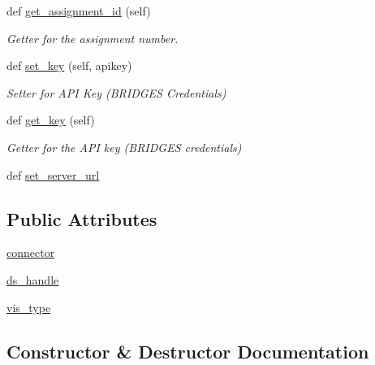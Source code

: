 \begin{DoxyCompactItemize}
def \hyperlink{classbridges_1_1bridges_1_1_bridges_a94f39f11368031ad33800aac0bac2f7d}{get\+\_\+assignment\+\_\+id} (self)
\begin{DoxyCompactList}\small\item\em Getter for the assignment number. \end{DoxyCompactList}\item 
def \hyperlink{classbridges_1_1bridges_1_1_bridges_a5841bc54e3663249e76f4b34f5a3a593}{set\+\_\+key} (self, apikey)
\begin{DoxyCompactList}\small\item\em Setter for A\+PI Key (B\+R\+I\+D\+G\+ES Credentials) \end{DoxyCompactList}\item 
def \hyperlink{classbridges_1_1bridges_1_1_bridges_afcdb0291c535b41fb7be31eaf5bf3677}{get\+\_\+key} (self)
\begin{DoxyCompactList}\small\item\em Getter for the A\+PI key (B\+R\+I\+D\+G\+ES credentials) \end{DoxyCompactList}\item 
def \hyperlink{classbridges_1_1bridges_1_1_bridges_a74009f2eaf24464f9769ea6166d20e59}{set\+\_\+server\+\_\+url}
\end{DoxyCompactItemize}
\subsection*{Public Attributes}
\begin{DoxyCompactItemize}
\item 
\hyperlink{classbridges_1_1bridges_1_1_bridges_a1c02ee44e7a4a3ee2f7d9c7d7da7d09f}{connector}
\item 
\hyperlink{classbridges_1_1bridges_1_1_bridges_a7a6f25612be64d4f3e203d7d37cb4da4}{ds\+\_\+handle}
\item 
\hyperlink{classbridges_1_1bridges_1_1_bridges_a5ca152bf3830e2be1f72247463916f82}{vis\+\_\+type}
\end{DoxyCompactItemize}


\subsection{Constructor \& Destructor Documentation}
\mbox{\label{classbridges_1_1bridges_1_1_bridges_af40aff29a2bc4efbaeb4186275fe7480}} 
